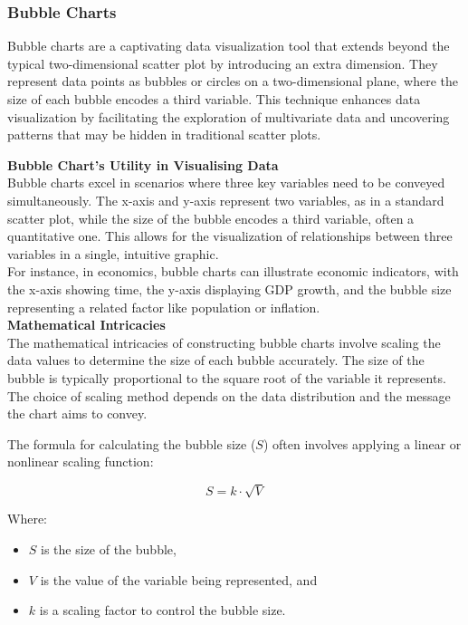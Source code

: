 \documentclass{article}\usepackage[]{graphicx}\usepackage[]{xcolor}
\begin{document}
\subsubsection{Bubble Charts}
Bubble charts are a captivating data visualization tool that extends beyond the typical two-dimensional scatter plot by introducing an extra dimension. They represent data points as bubbles or circles on a two-dimensional plane, where the size of each bubble encodes a third variable. This technique enhances data visualization by facilitating the exploration of multivariate data and uncovering patterns that may be hidden in traditional scatter plots.

\textbf{Bubble Chart's Utility in Visualising Data}\\
Bubble charts excel in scenarios where three key variables need to be conveyed simultaneously. The x-axis and y-axis represent two variables, as in a standard scatter plot, while the size of the bubble encodes a third variable, often a quantitative one. This allows for the visualization of relationships between three variables in a single, intuitive graphic.\\
For instance, in economics, bubble charts can illustrate economic indicators, with the x-axis showing time, the y-axis displaying GDP growth, and the bubble size representing a related factor like population or inflation. \\

\textbf{Mathematical Intricacies}\\
The mathematical intricacies of constructing bubble charts involve scaling the data values to determine the size of each bubble accurately. The size of the bubble is typically proportional to the square root of the variable it represents. The choice of scaling method depends on the data distribution and the message the chart aims to convey.

The formula for calculating the bubble size (\(S\)) often involves applying a linear or nonlinear scaling function:

\[
S = k \cdot \sqrt{V}
\]

Where:
\begin{itemize}
\item \(S\) is the size of the bubble,
\item \(V\) is the value of the variable being represented, and
\item \(k\) is a scaling factor to control the bubble size.
\end{itemize}
\end{document}
